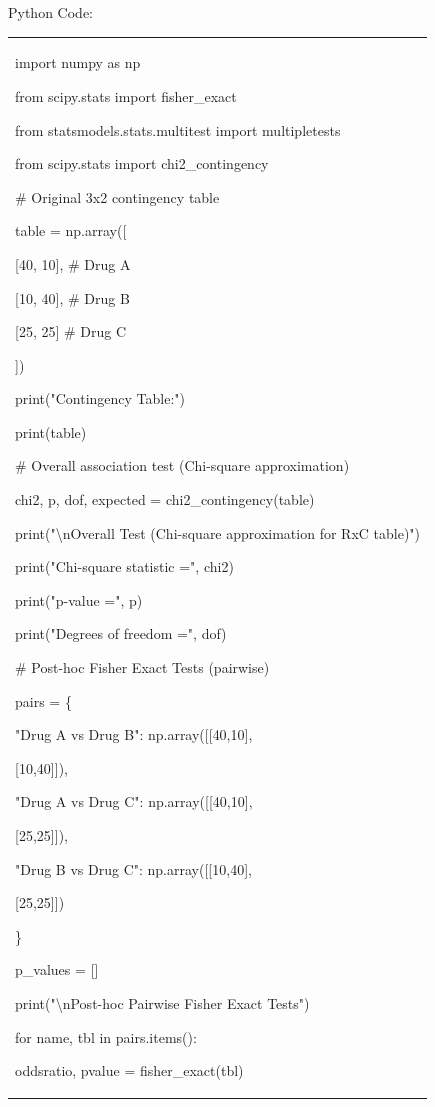 \documentclass[
]{article}
\newcounter{none} %
\begin{document}
Python Code:

{\def\LTcaptype{none} %
\begin{longtable}[]{@{}
  >{\raggedright\arraybackslash}p{}@{}}
\toprule\noalign{}
\begin{minipage}[b]{\linewidth}\raggedright
import numpy as np

from scipy.stats import fisher\_exact

from statsmodels.stats.multitest import multipletests

from scipy.stats import chi2\_contingency

\# Original 3x2 contingency table

table = np.array({[}

{[}40, 10{]}, \# Drug A

{[}10, 40{]}, \# Drug B

{[}25, 25{]} \# Drug C

{]})

print("Contingency Table:")

print(table)

\# Overall association test (Chi-square approximation)

chi2, p, dof, expected = chi2\_contingency(table)

print("\textbackslash nOverall Test (Chi-square approximation for RxC
table)")

print("Chi-square statistic =", chi2)

print("p-value =", p)

print("Degrees of freedom =", dof)

\# Post-hoc Fisher Exact Tests (pairwise)

pairs = \{

"Drug A vs Drug B": np.array({[}{[}40,10{]},

{[}10,40{]}{]}),

"Drug A vs Drug C": np.array({[}{[}40,10{]},

{[}25,25{]}{]}),

"Drug B vs Drug C": np.array({[}{[}10,40{]},

{[}25,25{]}{]})

\}

p\_values = {[}{]}

print("\textbackslash nPost-hoc Pairwise Fisher Exact Tests")

for name, tbl in pairs.items():

oddsratio, pvalue = fisher\_exact(tbl)


\end{minipage}
\end{longtable}}
\end{document}
